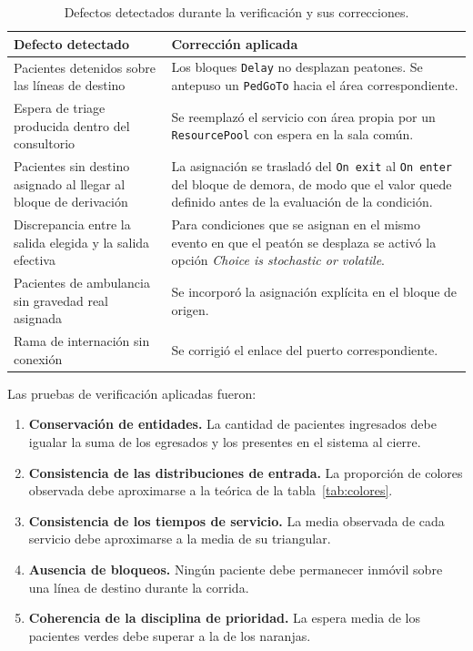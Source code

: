 \documentclass{article}
\begin{document}
\begin{table}[H]
\centering
\small
\begin{tabular}{p{5.4cm}p{8.4cm}}
\toprule
\textbf{Defecto detectado} & \textbf{Corrección aplicada} \\
\midrule
Pacientes detenidos sobre las líneas de destino &
Los bloques \texttt{Delay} no desplazan peatones. Se antepuso un
\texttt{PedGoTo} hacia el área correspondiente. \\
Espera de triage producida dentro del consultorio &
Se reemplazó el servicio con área propia por un \texttt{ResourcePool} con
espera en la sala común. \\
Pacientes sin destino asignado al llegar al bloque de derivación &
La asignación se trasladó del \texttt{On exit} al \texttt{On enter} del
bloque de demora, de modo que el valor quede definido antes de la evaluación
de la condición. \\
Discrepancia entre la salida elegida y la salida efectiva &
Para condiciones que se asignan en el mismo evento en que el peatón se
desplaza se activó la opción \emph{Choice is stochastic or volatile}. \\
Pacientes de ambulancia sin gravedad real asignada &
Se incorporó la asignación explícita en el bloque de origen. \\
Rama de internación sin conexión &
Se corrigió el enlace del puerto correspondiente. \\
\bottomrule
\end{tabular}
\caption{Defectos detectados durante la verificación y sus correcciones.}
\end{table}

Las pruebas de verificación aplicadas fueron:

\begin{enumerate}
  \item \textbf{Conservación de entidades.} La cantidad de pacientes
  ingresados debe igualar la suma de los egresados y los presentes en el
  sistema al cierre.
  \item \textbf{Consistencia de las distribuciones de entrada.} La proporción
  de colores observada debe aproximarse a la teórica de la
  tabla~\ref{tab:colores}.
  \item \textbf{Consistencia de los tiempos de servicio.} La media observada
  de cada servicio debe aproximarse a la media de su triangular.
  \item \textbf{Ausencia de bloqueos.} Ningún paciente debe permanecer
  inmóvil sobre una línea de destino durante la corrida.
  \item \textbf{Coherencia de la disciplina de prioridad.} La espera media de
  los pacientes verdes debe superar a la de los naranjas.
\end{enumerate}
\end{document}
